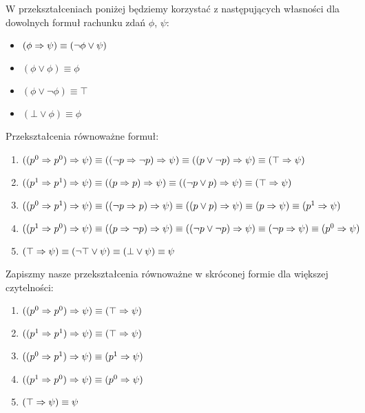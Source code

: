 W przekształceniach poniżej będziemy korzystać z następujących własności dla dowolnych formuł rachunku zdań $\phi$, $\psi$:

\begin{itemize}
	\item $(\phi \Rightarrow \psi) \equiv (\neg \phi \lor \psi)$
	\item $(\phi \lor \phi) \equiv \phi$
	\item $(\phi \lor \neg \phi) \equiv \top$
	\item $(\bot \lor \phi) \equiv \phi$
\end{itemize}

\noindent
Przekształcenia równoważne formuł:
\begin{enumerate}[label=(2.\arabic*),leftmargin=3\parindent]
    \item $((p^0 \Rightarrow p^0) \Rightarrow \psi) \equiv ((\neg p \Rightarrow \neg p)\Rightarrow \psi) \equiv ((p \lor \neg p) \Rightarrow \psi) \equiv (\top \Rightarrow \psi)$
    \item $((p^1 \Rightarrow p^1) \Rightarrow \psi) \equiv ((p \Rightarrow p)\Rightarrow \psi) \equiv ((\neg p \lor p) \Rightarrow \psi) \equiv (\top \Rightarrow \psi)$
    \item $((p^0 \Rightarrow p^1) \Rightarrow \psi) \equiv ((\neg p \Rightarrow p)\Rightarrow \psi) \equiv ((p \lor p) \Rightarrow \psi) \equiv (p \Rightarrow \psi) \equiv (p^1 \Rightarrow \psi)$
    \item $((p^1 \Rightarrow p^0) \Rightarrow \psi) \equiv ((p \Rightarrow \neg p)\Rightarrow \psi) \equiv ((\neg p \lor \neg p) \Rightarrow \psi) \equiv (\neg p \Rightarrow \psi) \equiv (p^0 \Rightarrow \psi)$
    \item $(\top \Rightarrow \psi) \equiv (\neg \top \lor \psi) \equiv (\bot \lor \psi) \equiv \psi$
\end{enumerate}

\noindent Zapiszmy nasze przekształcenia równoważne w skróconej formie dla większej czytelności:
\begin{enumerate}[label=(2.\arabic*),leftmargin=3\parindent]
    \setcounter{enumi}5
    \item $((p^0 \Rightarrow p^0) \Rightarrow \psi) \equiv (\top \Rightarrow \psi)$
    \item $((p^1 \Rightarrow p^1) \Rightarrow \psi) \equiv (\top \Rightarrow \psi)$
    \item $((p^0 \Rightarrow p^1) \Rightarrow \psi) \equiv (p^1 \Rightarrow \psi)$
    \item $((p^1 \Rightarrow p^0) \Rightarrow \psi) \equiv (p^0 \Rightarrow \psi)$
    \item $(\top \Rightarrow \psi) \equiv \psi$
\end{enumerate}